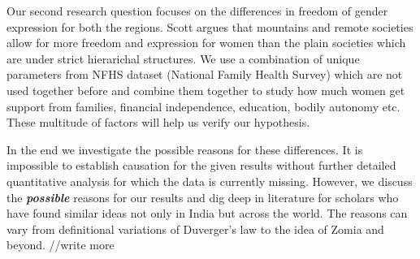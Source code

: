 \vspace{0.2cm}

Our second research question focuses on the differences in freedom of gender expression for both the regions. Scott argues that mountains and remote societies allow for more freedom and expression for women than the plain societies which are under strict hierarichal structures. We use a combination of unique parameters from NFHS dataset (National Family Health Survey) which are not used together before and combine them together to study how much women get support from families, financial independence, education, bodily autonomy etc. These multitude of factors will help us verify our hypothesis.

\vspace{0.2cm}

In the end we investigate the possible reasons for these differences. It is impossible to establish causation for the given results without further detailed quantitative analysis for which the data is currently missing. However, we discuss the \textit{\textbf{possible}} reasons for our results and dig deep in literature for scholars who have found similar ideas not only in India but across the world. The reasons can vary from definitional variations of Duverger's law to the idea of Zomia and beyond. 
//write more

